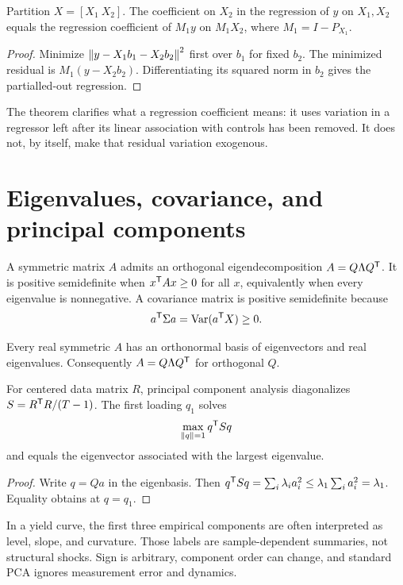 \begin{proposition}
Partition $X=[X_1\ X_2]$. The coefficient on $X_2$ in the regression of $y$ on
$X_1,X_2$ equals the regression coefficient of $M_1y$ on $M_1X_2$, where
$M_1=I-P_{X_1}$.
\end{proposition}
\begin{proof}
Minimize $\left\lVert y-X_1b_1-X_2b_2\right\rVert^2$ first over $b_1$ for fixed $b_2$. The minimized
residual is $M_1(y-X_2b_2)$. Differentiating its squared norm in $b_2$ gives the
partialled-out regression.
\end{proof}

The theorem clarifies what a regression coefficient means: it uses variation in a
regressor left after its linear association with controls has been removed. It does
not, by itself, make that residual variation exogenous.

\section{Eigenvalues, covariance, and principal components}

A symmetric matrix $A$ admits an orthogonal eigendecomposition
$A=Q\Lambda Q^\mathsf T$. It is positive semidefinite when
$x^\mathsf T Ax\geq0$ for all $x$, equivalently when every eigenvalue is
nonnegative. A covariance matrix is positive semidefinite because
\[
a^\mathsf T\Sigma a=\operatorname{Var}(a^\mathsf T X)\geq0.
\]

\begin{theorem}
Every real symmetric $A$ has an orthonormal basis of eigenvectors and real
eigenvalues. Consequently $A=Q\Lambda Q^\mathsf T$ for orthogonal $Q$.
\end{theorem}

For centered data matrix $R$, principal component analysis diagonalizes
$S=R^\mathsf T R/(T-1)$. The first loading $q_1$ solves
\[
\max_{\left\lVert q\right\rVert=1}q^\mathsf T Sq
\]
and equals the eigenvector associated with the largest eigenvalue.

\begin{proof}
Write $q=Qa$ in the eigenbasis. Then
$q^\mathsf T Sq=\sum_i\lambda_i a_i^2\leq\lambda_1\sum_i a_i^2=\lambda_1$.
Equality obtains at $q=q_1$.
\end{proof}

In a yield curve, the first three empirical components are often interpreted as
level, slope, and curvature. Those labels are sample-dependent summaries, not
structural shocks. Sign is arbitrary, component order can change, and standard PCA
ignores measurement error and dynamics.

